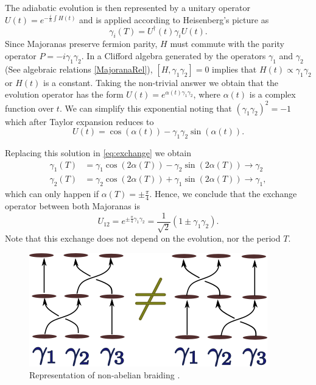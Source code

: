 The adiabatic evolution is then represented by a unitary operator  $ U(t) = e^{-\frac{i}{\hbar}\int H(t)} $ and is applied according to Heisenberg's picture as 
$$\gamma_i(T) = U^\dagger(t)\gamma_iU(t).$$
 \noindent Since Majoranas preserve fermion parity,  $H$ must commute with the parity operator  $P = -i\gamma_{1}\gamma_{2} $. In a Clifford algebra generated by the operators $\gamma_1$ and $\gamma_2$ (See algebraic relations \eqref{MajoranaRel}), $[H,\gamma_{1}\gamma_{2}]=0$ implies that $H(t) \propto \gamma_{1}\gamma_{2}$ or $H(t)$ is a constant. Taking the non-trivial answer we obtain that the  evolution operator has the form $  U(t) = e^{\alpha(t) \gamma_1\gamma_2}$, where $\alpha(t)$ is a complex function over $t$. We can simplify this exponential noting that $\left( \gamma_1\gamma_2 \right)^2 =-1$ which after Taylor expansion reduces to
 \begin{equation}
  U(t) = \cos(\alpha(t))-\gamma_1\gamma_2\sin(\alpha(t)).
 \end{equation}

Replacing this solution in \eqref{eq:exchange} we obtain 
\begin{equation}
\begin{aligned}
\gamma_1(T) &= \gamma_1 \cos(2\alpha(T))- \gamma_2 \sin(2\alpha(T)) \rightarrow  \gamma_2\\
\gamma_2(T) &= \gamma_2 \cos(2\alpha(T))+ \gamma_1 \sin(2\alpha(T)) \rightarrow  \gamma_1,
\end{aligned}
\label{eq:nonab}
\end{equation}
which can only happen if $\alpha(T) = \pm\frac{\pi}{4}$. Hence, we conclude that the exchange operator between both Majoranas is 
\begin{equation}
U_{12} = e^{\pm\frac{\pi}{4} \gamma_1\gamma_2}=\frac{1}{\sqrt{2}}\left( 1 \pm \gamma_1 \gamma_2 \right).
\end{equation}
Note that this exchange does not depend on the  evolution, nor  the period $T$. 

\begin{figure}
  \centering
  \includegraphics[scale=1]{IMAGES/Majorana/nonAb.png}
  \caption{\label{fig:Non-ab} Representation of non-abelian braiding .}
\end{figure}


